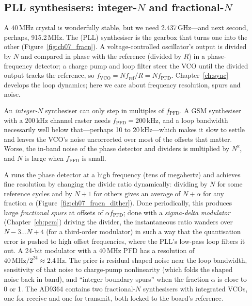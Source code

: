 \subsection{PLL synthesisers: integer-$N$ and fractional-$N$}

A 40\,MHz crystal is wonderfully stable, but we need 2.437\,GHz---and next second, perhaps,
915.2\,MHz. The  (PLL) synthesiser is the gearbox that turns one into the other
(Figure~\ref{fig:ch07_fracn}). A voltage-controlled oscillator's output is divided by $N$ and compared in
phase with the reference (divided by $R$) in a phase-frequency detector; a charge pump and loop filter
steer the VCO until the divided output tracks the reference, so
$f_{\text{VCO}}=Nf_{\text{ref}}/R=Nf_{\text{PFD}}$. Chapter~\ref{ch:sync} develops the loop dynamics;
here we care about frequency resolution, spurs and noise.

An \emph{integer-$N$} synthesiser can only step in multiples of $f_{\text{PFD}}$. A GSM synthesiser with
a 200\,kHz channel raster needs $f_{\text{PFD}}=200$\,kHz, and a loop bandwidth necessarily well below
that---perhaps 10 to 20\,kHz---which makes it slow to settle and leaves the VCO's noise uncorrected over
most of the offsets that matter. Worse, the in-band noise of the phase detector and dividers is
multiplied by $N^2$, and $N$ is large when $f_{\text{PFD}}$ is small.

A  runs the phase detector at a high frequency (tens of megahertz) and
achieves fine resolution by changing the divide ratio dynamically: dividing by $N$ for some reference
cycles and by $N+1$ for others gives an average of $N+\alpha$ for any fraction $\alpha$
(Figure~\ref{fig:ch07_fracn_dither}). Done periodically, this produces large \emph{fractional spurs} at
offsets of $\alpha f_{\text{PFD}}$; done with a \emph{sigma-delta modulator} (Chapter~\ref{ch:pcm})
driving the divider, the instantaneous ratio wanders over $N-3\ldots N+4$ (for a third-order modulator)
in such a way that the quantisation error is pushed to high offset frequencies, where the PLL's low-pass
loop filters it out. A 24-bit modulator with a 40\,MHz PFD has a resolution of
$40\,\text{MHz}/2^{24}\approx2.4$\,Hz. The price is residual shaped noise near the loop bandwidth,
sensitivity of that noise to charge-pump nonlinearity (which folds the shaped noise back in-band), and
``integer-boundary spurs'' when the fraction $\alpha$ is close to 0 or 1. The AD9364 contains two
fractional-$N$ synthesisers with integrated VCOs, one for receive and one for transmit, both locked to
the board's reference.

